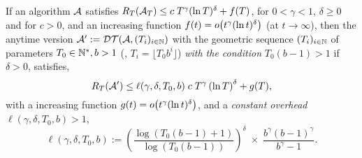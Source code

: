 \documentclass[12pt]{colt2018} %
\begin{document}



%

\begin{theorem}\label{thm:keep45}
    If an algorithm $\mathcal{A}$ satisfies
    $ R_T(\mathcal{A}_T) \leq c \; T^{\gamma} (\ln T)^{\delta} + f(T)$,
    for $0<\gamma<1$, $\delta \geq 0$
    and for $c > 0$, and an increasing function $f(t) = \mathop{}\mathopen{}o\mathopen{}\left(t^{\gamma} (\ln t)^{\delta}\right)$ (at $t\to\infty$),
    then the anytime version $\mathcal{A}':=\mathcal{DT}(\mathcal{A}, (T_i)_{i\in\mathbb{N}})$ with the geometric sequence $(T_i)_{i\in\mathbb{N}}$ of parameters $T_0\in\mathbb{N}^*,b>1$ (\ie, $T_i = \lfloor T_0 b^i\rfloor$)
    \emph{with the condition} $T_0 (b-1) > 1$ if $\delta>0$,
    satisfies,
    \begin{equation}\label{eq:keep45_1}
        R_T(\mathcal{A}') \leq \ell(\gamma, \delta, T_0, b) \; c \; T^{\gamma} \left(\ln T\right)^{\delta} + g(T),
    \end{equation}
    with a increasing function $g(t) = \mathop{}\mathopen{}o\mathopen{}\left(t^{\gamma} (\ln t)^{\delta}\right)$,
    and a \emph{constant overhead} $\ell(\gamma, \delta, T_0, b) > 1$,
    \begin{equation}\label{eq:keep45_2}
        \ell(\gamma, \delta, T_0, b) := \left(\frac{\log(T_0(b-1) + 1)}{\log(T_0(b-1))}\right)^{\delta} \; \times \; \frac{b^{\gamma} (b-1)^{\gamma}}{b^{\gamma} - 1}.
    \end{equation}
\end{theorem}
\end{document}
